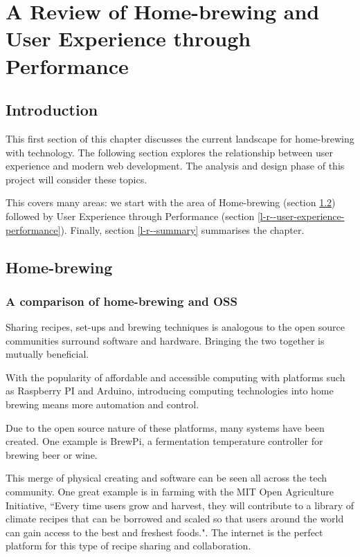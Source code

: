 \chapter{A Review of Home-brewing and User Experience through Performance}

\section{Introduction} \label{l-r--introduction}

This first section of this chapter discusses the current landscape for home-brewing with technology. The following section explores the relationship between user experience and modern web development. The analysis and design phase of this project will consider these topics.

This covers many areas: we start with the area of Home-brewing (section \ref{l-r--home-brewing}) followed by User Experience through Performance (section \ref{l-r--user-experience-performance}). Finally, section \ref{l-r--summary} summarises the chapter.

\section{Home-brewing} \label{l-r--home-brewing}



\subsection{A comparison of home-brewing and OSS}

Sharing recipes, set-ups and brewing techniques is analogous to the open source communities surround software and hardware. Bringing the two together is mutually beneficial.

With the popularity of affordable and accessible computing with platforms such as Raspberry PI and Arduino, introducing computing technologies into home brewing means more automation and control.

Due to the open source nature of these platforms, many systems have been created. One example is BrewPi, a fermentation temperature controller for brewing beer or wine. \cite{brewpi}

This merge of physical creating and software can be seen all across the tech community. One great example is in farming with the MIT Open Agriculture Initiative, ``Every time users grow and harvest, they will contribute to a library of climate recipes that can be borrowed and scaled so that users around the world can gain access to the best and freshest foods.". The internet is the perfect platform for this type of recipe sharing and collaboration. \cite{climate_recipes}

